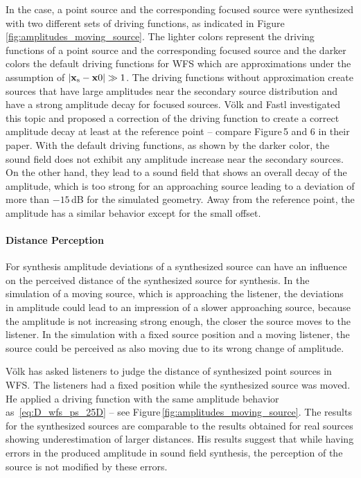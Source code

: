 In the \twohalfD case, a point source and the corresponding focused source were
synthesized with two different sets of driving functions, as indicated in
Figure\,\ref{fig:amplitudes_moving_source}. The lighter colors represent
the driving functions of a point source and the corresponding focused source
and the darker colors the default driving functions for \ac{WFS} which are
approximations under the assumption of $|\mathbf{x}_\text{s}-\mathbf{x}0| \gg 1$.
The driving functions without
approximation create sources that have large amplitudes near the secondary source
distribution and have a strong amplitude decay for focused sources.
Völk and Fastl investigated this topic and proposed
a correction of the
driving function to create a correct amplitude decay at least at
the reference point -- compare Figure\,5 and 6 in their paper.
With the default driving functions, as shown by the darker color, the sound
field does not exhibit any amplitude
increase near the secondary sources. On the other hand, they lead to a sound
field that shows an overall
decay of the amplitude, which is too strong for an approaching source leading
to a deviation of more than
$-15$\,dB for the simulated geometry.
Away from the reference point, the amplitude has a similar behavior except for
the small offset.


\paragraph{Distance Perception}
%
For \twohalfD synthesis amplitude deviations of a synthesized source can have an influence on the
perceived distance of the synthesized source for \twohalfD synthesis.
In the simulation of a moving source, which is approaching the listener, the
deviations in amplitude could lead to an impression of a
slower approaching source, because the amplitude is not increasing strong
enough, the
closer the source moves to the listener.
In the simulation with a fixed source position and a moving listener, the source
could be perceived as also moving due to its wrong change of amplitude.

Völk has asked listeners to judge the distance of synthesized
point sources in \ac{WFS}.\autocite{Volk2010} The listeners had a fixed position
while the
synthesized source was moved. He applied a driving function with the
same amplitude behavior as~\eqref{eq:D_wfs_ps_25D} -- see
Figure\,\ref{fig:amplitudes_moving_source}. The results for the synthesized
sources are comparable to the results obtained for real sources showing
underestimation of larger distances.\autocite{Zahorik2005}
His results suggest that while having errors in the produced amplitude in
\twohalfD sound field synthesis, the perception of the source is not
modified by these errors.

